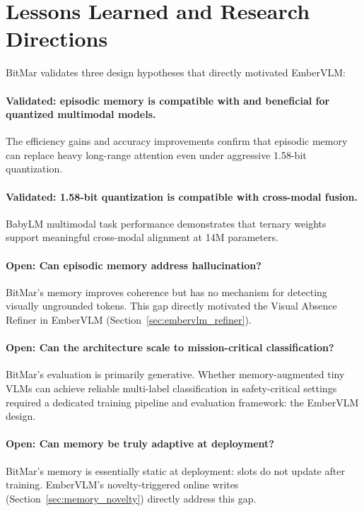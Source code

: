 \section{Lessons Learned and Research Directions}
\label{sec:bitmar_lessons}

BitMar validates three design hypotheses that directly motivated EmberVLM:

\paragraph{Validated: episodic memory is compatible with and beneficial for quantized multimodal models.} The efficiency gains and accuracy improvements confirm that episodic memory can replace heavy long-range attention even under aggressive 1.58-bit quantization.

\paragraph{Validated: 1.58-bit quantization is compatible with cross-modal fusion.} BabyLM multimodal task performance demonstrates that ternary weights support meaningful cross-modal alignment at 14M parameters.

\paragraph{Open: Can episodic memory address hallucination?} BitMar's memory improves coherence but has no mechanism for detecting visually ungrounded tokens. This gap directly motivated the Visual Absence Refiner in EmberVLM (Section~\ref{sec:embervlm_refiner}).

\paragraph{Open: Can the architecture scale to mission-critical classification?} BitMar's evaluation is primarily generative. Whether memory-augmented tiny VLMs can achieve reliable multi-label classification in safety-critical settings required a dedicated training pipeline and evaluation framework: the EmberVLM design.

\paragraph{Open: Can memory be truly adaptive at deployment?} BitMar's memory is essentially static at deployment: slots do not update after training. EmberVLM's novelty-triggered online writes (Section~\ref{sec:memory_novelty}) directly address this gap.
